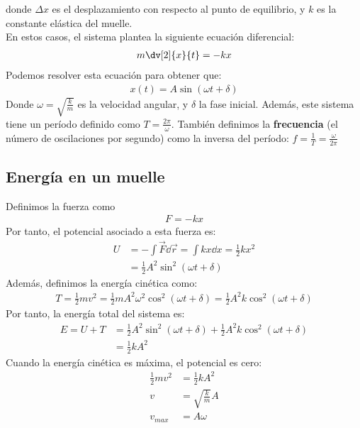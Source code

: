 \documentclass{article}
\begin{document}
donde $\Delta x$ es el desplazamiento con respecto al punto de equilibrio, y $k$ es la constante
elástica del muelle.\\
En estos casos, el sistema plantea la siguiente ecuación diferencial:
\begin{equation}
    \begin{split}
        m\dv[2]{x}{t} = -kx
    \end{split}
\end{equation}
Podemos resolver esta ecuación para obtener que:
\begin{equation}
    \begin{split}
        x(t)=A \sin(\omega t+\delta )
    \end{split}
\end{equation}
Donde $\omega = \sqrt{\frac{k}{m}}$ es la velocidad angular, y $\delta $ la fase inicial.
Además, este sistema tiene un período definido como $T= \frac{2\pi }{\omega }$. También definimos
la \textbf{frecuencia} (el número de oscilaciones por segundo) como la inversa del período:
$f = \frac{1}{T} = \frac{\omega}{2\pi }$
\subsection{Energía en un muelle}
Definimos la fuerza como
\begin{equation}
    \begin{split}
        F = -kx
    \end{split}
\end{equation}
Por tanto, el potencial asociado a esta fuerza es:
\begin{equation}
    \begin{split}
        U &= - \int \vec{F} \dd{\vec{r}} = \int kx \dd{x} = \frac{1}{2} k x^{2}\\
        &= \frac{1}{2} A^{2} \sin^{2} (\omega t+\delta )
    \end{split}
\end{equation}
Además, definimos la energía cinética como:
\begin{equation}
    \begin{split}
        T = \frac{1}{2}m v^{2}= \frac{1}{2} m A^{2}\omega^{2} \cos^{2}(\omega t + \delta )
        = \frac{1}{2} A^{2} k \cos^{2}(\omega t +\delta )
    \end{split}
\end{equation}
Por tanto, la energía total del sistema es:
\begin{equation}
    \begin{split}
        E = U+T &= \frac{1}{2} A^{2} \sin^{2} (\omega t+\delta ) +
        \frac{1}{2} A^{2} k \cos^{2}(\omega t +\delta )\\
        &= \frac{1}{2} k A^{2}
    \end{split}
\end{equation}
Cuando la energía cinética es máxima, el potencial es cero:
\begin{equation}
    \begin{split}
        \frac{1}{2}mv^{2} &= \frac{1}{2} kA^{2}\\
        v &= \sqrt{\frac{k}{m}}A\\
        v_{max} &= A\omega 
    \end{split}
\end{equation}
\end{document}
